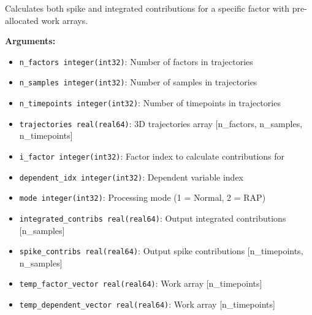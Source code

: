 \begin{enumerate}
\begin{enumerate}
                  Calculates both spike and integrated contributions for a specific factor
                  with pre-allocated work arrays.
                  
                  \textbf{Arguments:}
                  \begin{itemize}
                    \item \texttt{n\_factors integer(int32)}: Number of factors in trajectories
                          
                    \item \texttt{n\_samples integer(int32)}: Number of samples in trajectories
                          
                    \item \texttt{n\_timepoints integer(int32)}: Number of timepoints in
                          trajectories
                          
                    \item \texttt{trajectories real(real64)}: 3D trajectories array [n\_factors,
                    n\_samples, n\_timepoints]
                    
                    \item \texttt{i\_factor integer(int32)}: Factor index to calculate contributions
                          for
                          
                    \item \texttt{dependent\_idx integer(int32)}: Dependent variable index
                          
                    \item \texttt{mode integer(int32)}: Processing mode (1 = Normal, 2 =
                          RAP)
                          
                    \item \texttt{integrated\_contribs real(real64)}: Output integrated contributions
                          [n\_samples]
                          
                    \item \texttt{spike\_contribs real(real64)}: Output spike contributions
                          [n\_timepoints, n\_samples]
                          
                    \item \texttt{temp\_factor\_vector real(real64)}: Work array [n\_timepoints]
                          
                    \item \texttt{temp\_dependent\_vector real(real64)}: Work array [n\_timepoints]
                          

\end{itemize}
\end{enumerate}
\end{enumerate}
